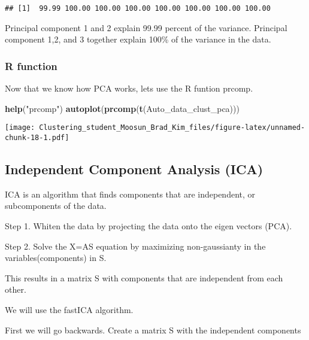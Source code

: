 \documentclass[11pt,]{article}
\newenvironment{Shaded}{\begin{snugshade}}{\end{snugshade}}
\newcommand{\KeywordTok}[1]{\textcolor[rgb]{0.13,0.29,0.53}{\textbf{#1}}}
\newcommand{\NormalTok}[1]{#1}
\newcommand{\StringTok}[1]{\textcolor[rgb]{0.31,0.60,0.02}{#1}}
\begin{document}
\begin{verbatim}
## [1]  99.99 100.00 100.00 100.00 100.00 100.00 100.00 100.00
\end{verbatim}

Principal component 1 and 2 explain 99.99 percent of the variance.
Principal component 1,2, and 3 together explain 100\% of the variance in
the data.

\hypertarget{r-function-2}{%
\subsubsection{R function}\label{r-function-2}}

Now that we know how PCA works, lets use the R funtion prcomp.

\begin{Shaded}
\begin{Highlighting}[]
\KeywordTok{help}\NormalTok{(}\StringTok{"prcomp"}\NormalTok{)}
\KeywordTok{autoplot}\NormalTok{(}\KeywordTok{prcomp}\NormalTok{(}\KeywordTok{t}\NormalTok{(Auto_data_clust_pca)))}
\end{Highlighting}
\end{Shaded}

\texttt{[image: Clustering\_student\_Moosun\_Brad\_Kim\_files/figure-latex/unnamed-chunk-18-1.pdf]}

\newpage

\hypertarget{independent-component-analysis-ica}{%
\subsection{Independent Component Analysis
(ICA)}\label{independent-component-analysis-ica}}

ICA is an algorithm that finds components that are independent, or
subcomponents of the data.

Step 1. Whiten the data by projecting the data onto the eigen vectors
(PCA).

Step 2. Solve the X=AS equation by maximizing non-gaussianty in the
variables(components) in S.

This results in a matrix S with components that are independent from
each other.

We will use the fastICA algorithm.

First we will go backwards. Create a matrix S with the independent
components
\end{document}
